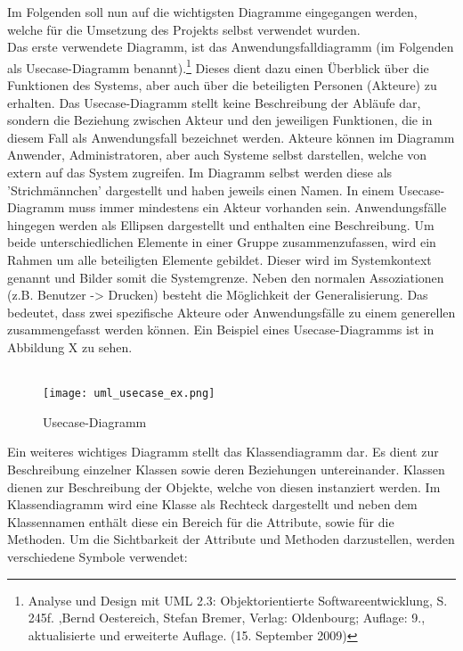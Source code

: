 Im Folgenden soll nun auf die wichtigsten Diagramme eingegangen werden, welche für die Umsetzung des Projekts selbst verwendet wurden.\\
Das erste verwendete Diagramm, ist das Anwendungsfalldiagramm (im Folgenden als Usecase-Diagramm benannt).\footnote{Analyse und Design mit UML 2.3: Objektorientierte Softwareentwicklung, S. 245f. ,Bernd Oestereich, Stefan Bremer, Verlag: Oldenbourg; Auflage: 9., aktualisierte und erweiterte Auflage. (15. September 2009)} 
Dieses dient dazu einen Überblick über die Funktionen des Systems, aber auch über die beteiligten Personen (Akteure) zu erhalten. Das Usecase-Diagramm stellt keine Beschreibung der Abläufe dar, sondern die Beziehung zwischen Akteur und den jeweiligen Funktionen, die in diesem Fall als Anwendungsfall bezeichnet werden. Akteure können im Diagramm Anwender, Administratoren, aber auch Systeme selbst darstellen, welche von extern auf das System zugreifen. Im Diagramm selbst werden diese als 'Strichmännchen' dargestellt und haben jeweils einen Namen. In einem Usecase-Diagramm muss immer mindestens ein Akteur vorhanden sein.
Anwendungsfälle hingegen werden als Ellipsen dargestellt und enthalten eine Beschreibung.
Um beide unterschiedlichen Elemente in einer Gruppe zusammenzufassen, wird ein Rahmen um alle beteiligten Elemente gebildet.
Dieser wird im Systemkontext genannt und Bilder somit die Systemgrenze.
Neben den normalen Assoziationen (z.B. Benutzer -> Drucken) besteht die Möglichkeit der Generalisierung.
Das bedeutet, dass zwei spezifische Akteure oder Anwendungsfälle zu einem generellen zusammengefasst werden können.
Ein Beispiel eines Usecase-Diagramms ist in Abbildung X zu sehen.\\
\\
\begin{figure}[H]
\centering
\texttt{[image: uml\_usecase\_ex.png]}
\caption{Usecase-Diagramm}
\label{fig:show_s1_s2_p1_n1}
\end{figure}
Ein weiteres wichtiges Diagramm stellt das Klassendiagramm dar. Es dient zur Beschreibung einzelner Klassen sowie deren Beziehungen untereinander. Klassen dienen zur Beschreibung der Objekte, welche von diesen instanziert werden. Im Klassendiagramm wird eine Klasse als Rechteck dargestellt und neben dem Klassennamen enthält diese ein Bereich für die Attribute, sowie für die Methoden.
Um die Sichtbarkeit der Attribute und Methoden darzustellen, werden verschiedene Symbole verwendet:\\

